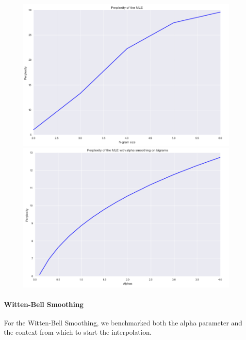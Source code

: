 \documentclass[11pt]{article}
\begin{document}
\begin{figure}[H]
  \centering
  \begin{minipage}[b]{0.45\textwidth}
    \includegraphics[width=\textwidth]{perp_mle}
  \end{minipage}
  \hfill
  \begin{minipage}[b]{0.45\textwidth}
    \includegraphics[width=\textwidth]{perp_alpha}
  \end{minipage}
\end{figure}


\paragraph{Witten-Bell Smoothing}

For the Witten-Bell Smoothing, we benchmarked both the alpha parameter and the context from which to start the interpolation.
\end{document}
